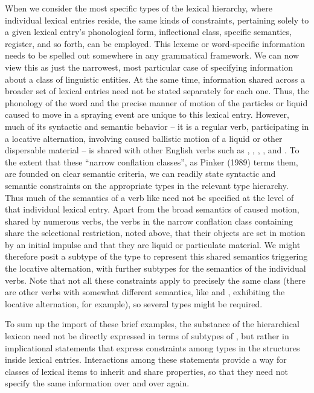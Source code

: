 \documentclass[output=paper]{langsci/langscibook}
\begin{document}
When we consider the most specific types of the lexical hierarchy, where individual lexical entries reside, the same kinds of constraints, pertaining solely to a given lexical entry's phonological form, inflectional class, specific semantics, register, and so forth, can be employed.
This lexeme or word-specific information needs to be spelled out somewhere in any grammatical framework.
We can now view this as just the narrowest, most particular case of specifying information about a class of linguistic entities.
At the same time, information shared across a broader set of lexical entries need not be stated separately for each one. 
Thus, the phonology of the word  and the precise manner of motion of the particles or liquid caused to move in a spraying event are unique to this lexical entry.
However, much of its syntactic and semantic behavior -- it is a regular verb,  participating in a locative alternation, involving caused ballistic motion of a liquid or other dispersable material -- is shared with other English verbs such as , , , , and .
To the extent that these ``narrow conflation classes'', as Pinker (1989) terms them, are founded on clear semantic criteria, we can readily state syntactic and semantic constraints on the appropriate types in the relevant type hierarchy.
Thus much of the semantics of a verb like  need not be specified at the level of that individual lexical entry.
Apart from the broad semantics of caused motion, shared by numerous verbs, the verbs in the narrow conflation class containing  share the selectional restriction, noted above, that their objects are set in motion by an initial impulse and that they are liquid or particulate material.
We might therefore posit a subtype of the type  to represent this shared semantics triggering the locative alternation, with further subtypes for the semantics of the individual verbs.
Note that not all these constraints apply to precisely the same class (there are other verbs with somewhat different semantics, like  and , exhibiting the locative alternation, for example), so several types might be required.

To sum up the import of these brief examples, the substance of the hierarchical lexicon need not be directly expressed in terms of subtypes of , but rather in implicational statements that express constraints among types in the structures inside lexical entries.
Interactions among these statements provide a way for classes of lexical items to inherit and share properties, so that they need not specify the same information over and over again.
\end{document}
